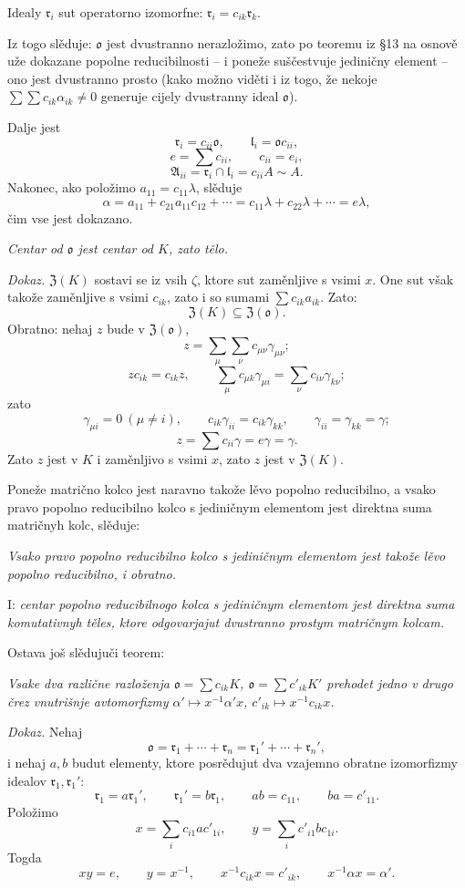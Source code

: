 \documentclass[11pt]{article}
\providecommand{\mA}{\mathfrak{A}}
\providecommand{\ml}{\mathfrak{l}}
\providecommand{\mo}{\mathfrak{o}}
\providecommand{\mr}{\mathfrak{r}}
\providecommand{\mZ}{\mathfrak{Z}}
\begin{document}
Idealy $\mr_i$ sut operatorno izomorfne: $\mr_i=c_{ik}\mr_k$.

Iz togo slěduje: $\mo$ jest dvustranno nerazložimo, zato po teoremu iz §13 na osnově uže dokazane popolne reducibilnosti -- i poneže suščestvuje jediničny element -- ono jest dvustranno prosto (kako možno viděti i iz togo, že nekoje $\sum\sum c_{ik}\alpha_{ik}\ne0$ generuje cijely dvustranny ideal $\mo$).

Dalje jest
\[
        \mr_i=c_{ii}\mo,
        \qquad
        \ml_i=\mo c_{ii},
\]
\[
        e=\sum c_{ii},
        \qquad c_{ii}=e_i,
\]
\[
        \mA_{ii}=\mr_i\cap\ml_i=c_{ii}A\sim A.
\]
Nakonec, ako položimo $a_{11}=c_{11}\lambda$, slěduje
\[
        \alpha=a_{11}+c_{21}a_{11}c_{12}+\cdots
        =c_{11}\lambda+c_{22}\lambda+\cdots=e\lambda,
\]
čim vse jest dokazano.

\emph{Centar od $\mo$ jest centar od $K$, zato tělo.}

\emph{Dokaz.} $\mZ(K)$ sostavi se iz vsih $\zeta$, ktore sut zaměnljive s vsimi $x$. One sut však takože zaměnljive s vsimi $c_{ik}$, zato i so sumami $\sum c_{ik}a_{ik}$. Zato:
\[
        \mZ(K)\subseteq\mZ(\mo).
\]
Obratno: nehaj $z$ bude v $\mZ(\mo)$,
\[
        z=\sum_\mu\sum_\nu c_{\mu\nu}\gamma_{\mu\nu};
\]
\[
        zc_{ik}=c_{ik}z,
        \qquad
        \sum_\mu c_{\mu k}\gamma_{\mu i}=\sum_\nu c_{i\nu}\gamma_{k\nu};
\]
zato
\[
        \gamma_{\mu i}=0\ (\mu\ne i),
        \qquad
        c_{ik}\gamma_{ii}=c_{ik}\gamma_{kk},
        \qquad
        \gamma_{ii}=\gamma_{kk}=\gamma;
\]
\[
        z=\sum c_{ii}\gamma=e\gamma=\gamma.
\]
Zato $z$ jest v $K$ i zaměnljivo s vsimi $x$, zato $z$ jest v $\mZ(K)$.

Poneže matrično kolco jest naravno takože lěvo popolno reducibilno, a vsako pravo popolno reducibilno kolco s jediničnym elementom jest direktna suma matričnyh kolc, slěduje:

\emph{Vsako pravo popolno reducibilno kolco s jediničnym elementom jest takože lěvo popolno reducibilno, i obratno.}

I: \emph{centar popolno reducibilnogo kolca s jediničnym elementom jest direktna suma komutativnyh těles, ktore odgovarjajut dvustranno prostym matričnym kolcam.}

Ostava još slědujuči teorem:

\emph{Vsake dva različne razloženja $\mo=\sum c_{ik}K$, $\mo=\sum c'_{ik}K'$ prehodet jedno v drugo črez vnutrišnje avtomorfizmy $\alpha'\mapsto x^{-1}\alpha'x$, $c'_{ik}\mapsto x^{-1}c_{ik}x$.}

\emph{Dokaz.} Nehaj
\[
        \mo=\mr_1+\cdots+\mr_n=\mr_1'+\cdots+\mr_n',
\]
i nehaj $a,b$ budut elementy, ktore posrědujut dva vzajemno obratne izomorfizmy idealov $\mr_1,\mr_1'$:
\[
        \mr_1=a\mr_1',
        \qquad
        \mr_1'=b\mr_1,
        \qquad
        ab=c_{11},
        \qquad
        ba=c'_{11}.
\]
Položimo
\[
        x=\sum_i c_{i1}ac'_{1i},
        \qquad
        y=\sum_i c'_{i1}bc_{1i}.
\]
Togda
\[
        xy=e,
        \qquad
        y=x^{-1},
        \qquad
        x^{-1}c_{ik}x=c'_{ik},
        \qquad
        x^{-1}\alpha x=\alpha'.
\]
\end{document}
